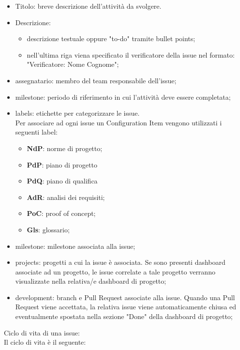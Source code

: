 \begin{itemize}
    \item Titolo: breve descrizione dell’attività da svolgere.
    \item Descrizione:
        \begin{itemize}
            \item descrizione testuale oppure "to-do" tramite bullet points;
            \item nell'ultima riga viena specificato il verificatore della issue nel formato: "Verificatore: Nome Cognome";
        \end{itemize}
    \item assegnatario: membro del team responsabile dell'issue;
    \item milestone: periodo di riferimento in cui l’attività deve essere completata;
    \item labels: etichette per categorizzare le issue. \\Per associare ad ogni issue un Configuration Item vengono utilizzati i seguenti label:
        \begin{itemize}
            \item \textbf{NdP}: norme di progetto;
            \item \textbf{PdP}: piano di progetto
            \item \textbf{PdQ}: piano di qualifica
            \item \textbf{AdR}: analisi dei requisiti;
            \item \textbf{PoC}: proof of concept;
            \item \textbf{Gls}: glossario;
        \end{itemize}
    \item milestone: milestone associata alla issue;
    \item projects: progetti a cui la issue è associata. Se sono presenti dashboard associate ad un progetto, le issue correlate a tale progetto verranno visualizzate nella relativa/e dashboard di progetto;
    \item development: branch e Pull Request associate alla issue. Quando una Pull Request viene accettata, la relativa issue viene automaticamente chiusa ed eventualmente spostata nella sezione "Done" della dashboard di progetto;
\end{itemize}
Ciclo di vita di una issue:\\
Il ciclo di vita è il seguente:
